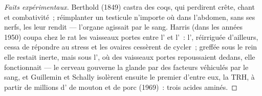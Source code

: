 \begin{proof}[Faits expérimentaux]
Berthold (1849) castra des coqs, qui perdirent crête, chant et
combativité~; réimplanter un testicule n'importe où dans l'abdomen, sans
ses nerfs, les leur rendit --- l'organe agissait par le sang. Harris
(dans les années 1950) coupa chez le rat les vaisseaux portes entre
l' et l'~: l', réirriguée d'ailleurs,
cessa de répondre au stress et les ovaires cessèrent de cycler~; greffée
sous le rein elle restait inerte, mais sous l', où des
vaisseaux portes repoussaient dedans, elle fonctionnait --- le cerveau
gouverne la glande par des facteurs véhiculés par le sang, et Guillemin
et Schally isolèrent ensuite le premier d'entre eux, la TRH, à partir de
millions d' de mouton et de porc (1969)~: trois acides
aminés.
\end{proof}

